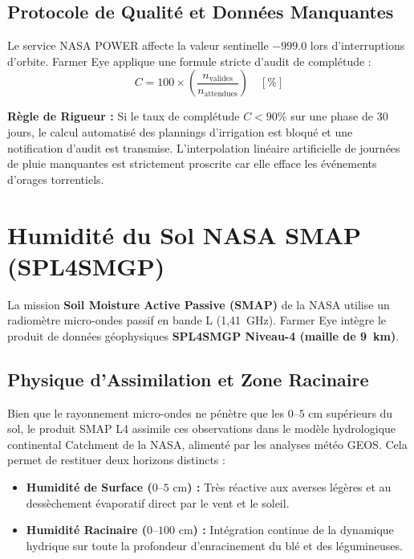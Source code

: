 \documentclass[11pt,a4paper,oneside]{report}
\begin{document}
\subsection{Protocole de Qualité et Données Manquantes}
Le service NASA POWER affecte la valeur sentinelle $-999.0$ lors d'interruptions d'orbite. Farmer Eye applique une formule stricte d'audit de complétude :
\begin{equation}
C = 100 \times \left( \frac{n_{\text{valides}}}{n_{\text{attendues}}} \right) \quad [\%]
\end{equation}
\begin{notebox}
\textbf{Règle de Rigueur :} Si le taux de complétude $C < 90\%$ sur une phase de 30 jours, le calcul automatisé des plannings d'irrigation est bloqué et une notification d'audit est transmise. L'interpolation linéaire artificielle de journées de pluie manquantes est strictement proscrite car elle efface les événements d'orages torrentiels.
\end{notebox}

\section{Humidité du Sol NASA SMAP (SPL4SMGP)}
La mission \textbf{Soil Moisture Active Passive (SMAP)} de la NASA utilise un radiomètre micro-ondes passif en bande L (1,41~GHz). Farmer Eye intègre le produit de données géophysiques \textbf{SPL4SMGP Niveau-4 (maille de 9~km)}.

\subsection{Physique d'Assimilation et Zone Racinaire}
Bien que le rayonnement micro-ondes ne pénètre que les $0–5\text{ cm}$ supérieurs du sol, le produit SMAP L4 assimile ces observations dans le modèle hydrologique continental Catchment de la NASA, alimenté par les analyses météo GEOS. Cela permet de restituer deux horizons distincts :
\begin{itemize}[leftmargin=*]
    \item \textbf{Humidité de Surface ($0–5\text{ cm}$) :} Très réactive aux averses légères et au dessèchement évaporatif direct par le vent et le soleil.
    \item \textbf{Humidité Racinaire ($0–100\text{ cm}$) :} Intégration continue de la dynamique hydrique sur toute la profondeur d'enracinement du blé et des légumineuses.
\end{itemize}
\end{document}
